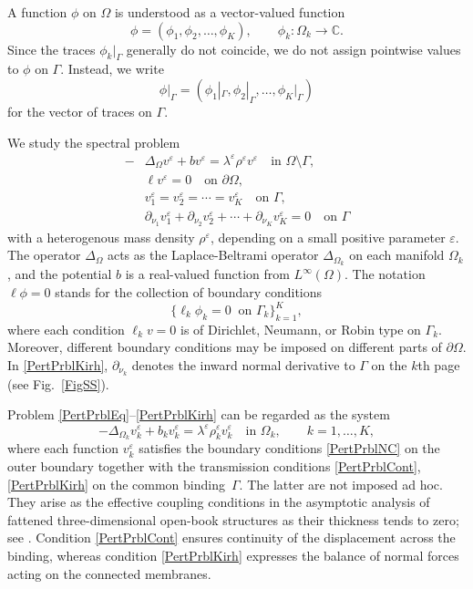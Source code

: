 \documentclass[reqno]{amsart}
\theoremstyle{definition}
\theoremstyle{remark}
\numberwithin{equation}{section}
\newcommand{\Comp}{\mathbb C}
\newcommand{\eps}{\varepsilon}
\newcommand{\ve}{v^\eps}
\newcommand{\lme}{\lambda^\eps}
\begin{document}
A function $\phi$ on $\Omega$ is understood as a vector-valued function
\begin{equation*}
  \phi=(\phi_1,\phi_2,\dots,\phi_K), \qquad \phi_k\colon \Omega_k\to \Comp.
\end{equation*}
Since the traces $\phi_k|_\Gamma$ generally do not coincide, we do not assign pointwise values to $\phi$ on $\Gamma$. Instead, we write
\begin{equation*}
  \phi|_\Gamma=(\phi_1|_\Gamma,\phi_2|_\Gamma,\dots,\phi_K|_\Gamma)
\end{equation*}
for the vector of traces on $\Gamma$. 


We study the spectral problem
\begin{align}\label{PertPrblEq}
 -&\Delta_\Omega \ve+b\ve=\lme\rho^\eps \ve \quad\text{in }\Omega\setminus\Gamma,\\\label{PertPrblNC}
 &\ell\ve=0\quad\text{on } \partial\Omega,\\\label{PertPrblCont}
 &\ve_1=\ve_2=\cdots=\ve_K\quad\text{on } \Gamma,\\\label{PertPrblKirh}
 &\partial_{\nu_1}\ve_1+\partial_{\nu_2}\ve_2+\cdots+\partial_{\nu_K}\ve_K=0 \quad\text{on } \Gamma
\end{align}
with a heterogenous  mass density $\rho^\eps$, depending on a small positive parameter $\eps$.  The operator $\Delta_\Omega$ acts as the Laplace-Beltrami operator $\Delta_{\Omega_k}$ on each manifold  $\Omega_k$, and the potential $b$ is a real-valued function from  $L^\infty(\Omega)$. The notation $\ell \phi=0$ stands for the collection of boundary conditions 
\begin{equation*}
  \big\{\ell_k \phi_k=0\;\;\text{on } \Gamma_k\big\}_{k=1}^K,
\end{equation*}
where each condition $\ell_k v=0$ is of Dirichlet, Neumann, or Robin type on $\Gamma_k$. Moreover, different boundary conditions may be imposed on different parts of $\partial\Omega$. 
In \eqref{PertPrblKirh}, $\partial_{\nu_k}$ denotes the inward normal derivative to $\Gamma$ on the $k$th page (see Fig.~\ref{FigSS}).



Problem \eqref{PertPrblEq}--\eqref{PertPrblKirh} can be regarded as the system
\begin{equation*}
  -\Delta_{\Omega_k}\ve_k+b_k\ve_k=\lme\rho^\eps_k\ve_k   \quad\text{in }\Omega_k,\qquad k=1,\dots,K,
\end{equation*}
where each function $\ve_k$ satisfies the boundary conditions \eqref{PertPrblNC} on the outer boundary together with the transmission
conditions \eqref{PertPrblCont}, \eqref{PertPrblKirh} on the common binding~$\Gamma$.
The latter are not imposed ad hoc. They arise as the effective coupling conditions in the asymptotic analysis of  fattened three-dimensional open-book structures as their thickness tends to zero; see \cite{CorbinKuchment2020,Corbin2020,AkdumanKuchment2024}.
Condition \eqref{PertPrblCont} ensures continuity of the displacement across the binding, whereas condition \eqref{PertPrblKirh} expresses the balance of normal forces acting on the connected membranes.
\end{document}
